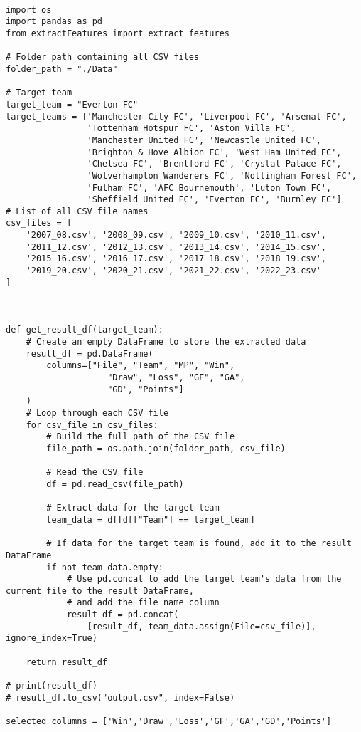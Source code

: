 \begin{lstlisting}[style=pystyle]

import os
import pandas as pd
from extractFeatures import extract_features

# Folder path containing all CSV files
folder_path = "./Data"

# Target team
target_team = "Everton FC"
target_teams = ['Manchester City FC', 'Liverpool FC', 'Arsenal FC',
                'Tottenham Hotspur FC', 'Aston Villa FC',
                'Manchester United FC', 'Newcastle United FC',
                'Brighton & Hove Albion FC', 'West Ham United FC',
                'Chelsea FC', 'Brentford FC', 'Crystal Palace FC',
                'Wolverhampton Wanderers FC', 'Nottingham Forest FC',
                'Fulham FC', 'AFC Bournemouth', 'Luton Town FC',
                'Sheffield United FC', 'Everton FC', 'Burnley FC']
# List of all CSV file names
csv_files = [
    '2007_08.csv', '2008_09.csv', '2009_10.csv', '2010_11.csv',
    '2011_12.csv', '2012_13.csv', '2013_14.csv', '2014_15.csv',
    '2015_16.csv', '2016_17.csv', '2017_18.csv', '2018_19.csv',
    '2019_20.csv', '2020_21.csv', '2021_22.csv', '2022_23.csv'
]



def get_result_df(target_team):
    # Create an empty DataFrame to store the extracted data
    result_df = pd.DataFrame(
        columns=["File", "Team", "MP", "Win",
                    "Draw", "Loss", "GF", "GA",
                    "GD", "Points"]
    )
    # Loop through each CSV file
    for csv_file in csv_files:
        # Build the full path of the CSV file
        file_path = os.path.join(folder_path, csv_file)

        # Read the CSV file
        df = pd.read_csv(file_path)

        # Extract data for the target team
        team_data = df[df["Team"] == target_team]

        # If data for the target team is found, add it to the result DataFrame
        if not team_data.empty:
            # Use pd.concat to add the target team's data from the current file to the result DataFrame,
            # and add the file name column
            result_df = pd.concat(
                [result_df, team_data.assign(File=csv_file)], ignore_index=True)

    return result_df

# print(result_df)
# result_df.to_csv("output.csv", index=False)

selected_columns = ['Win','Draw','Loss','GF','GA','GD','Points']


\end{lstlisting}
